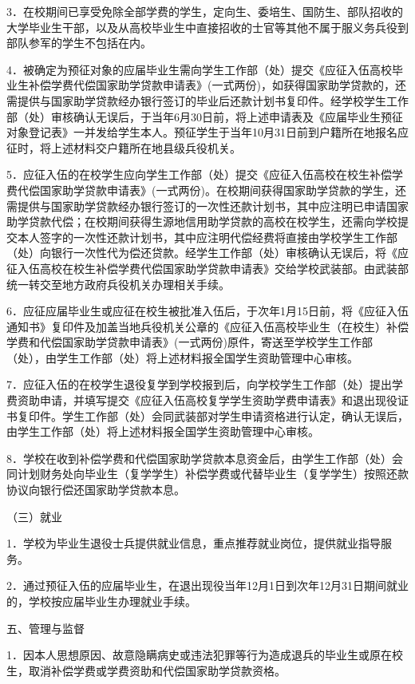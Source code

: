 \documentclass[UTF8,12pt,a4paper]{report}
\begin{document}
3．在校期间已享受免除全部学费的学生，定向生、委培生、国防生、部队招收的大学毕业生干部，以及从高校毕业生中直接招收的士官等其他不属于服义务兵役到部队参军的学生不包括在内。

4．被确定为预征对象的应届毕业生需向学生工作部（处）提交《应征入伍高校毕业生补偿学费代偿国家助学贷款申请表》(一式两份)，如获得国家助学贷款的，还需提供与国家助学贷款经办银行签订的毕业后还款计划书复印件。经学校学生工作部（处）审核确认无误后，于当年6月30日前，将上述申请表及《应届毕业生预征对象登记表》一并发给学生本人。预征学生于当年10月31日前到户籍所在地报名应征时，将上述材料交户籍所在地县级兵役机关。

5．应征入伍的在校学生应向学生工作部（处）提交《应征入伍高校在校生补偿学费代偿国家助学贷款申请表》(一式两份)。在校期间获得国家助学贷款的学生，还需提供与国家助学贷款经办银行签订的一次性还款计划书，其中应注明已申请国家助学贷款代偿；在校期间获得生源地信用助学贷款的高校在校学生，还需向学校提交本人签字的一次性还款计划书，其中应注明代偿经费将直接由学校学生工作部（处）向银行一次性代为偿还贷款。经学生工作部（处）审核确认无误后，将《应征入伍高校在校生补偿学费代偿国家助学贷款申请表》交给学校武装部。由武装部统一转交至地方政府兵役机关办理相关手续。

6．应征应届毕业生或应征在校生被批准入伍后，于次年1月15日前，将《应征入伍通知书》复印件及加盖当地兵役机关公章的《应征入伍高校毕业生（在校生）补偿学费和代偿国家助学贷款申请表》(一式两份)原件，寄送至学校学生工作部（处），由学生工作部（处）将上述材料报全国学生资助管理中心审核。

7．应征入伍的在校学生退役复学到学校报到后，向学校学生工作部（处）提出学费资助申请，并填写提交《应征入伍高校复学学生资助学费申请表》和退出现役证书复印件。学生工作部（处）会同武装部对学生申请资格进行认定，确认无误后，由学生工作部（处）将上述材料报全国学生资助管理中心审核。

8．学校在收到补偿学费和代偿国家助学贷款本息资金后，由学生工作部（处）会同计划财务处向毕业生（复学学生）补偿学费或代替毕业生（复学学生）按照还款协议向银行偿还国家助学贷款本息。

（三）就业

1．学校为毕业生退役士兵提供就业信息，重点推荐就业岗位，提供就业指导服务。

2．通过预征入伍的应届毕业生，在退出现役当年12月1日到次年12月31日期间就业的，学校按应届毕业生办理就业手续。

五、管理与监督

1．因本人思想原因、故意隐瞒病史或违法犯罪等行为造成退兵的毕业生或原在校生，取消补偿学费或学费资助和代偿国家助学贷款资格。
\end{document}
